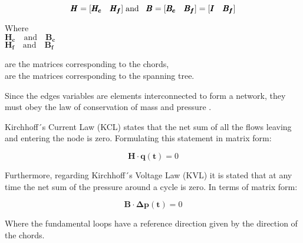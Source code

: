 \begin{equation}
\pmb{H} = [\pmb{H_c} \quad \pmb{H_f}]
\hspace{0.1cm} \text{and}\hspace{0.3cm}
\pmb{B} = [\pmb{B_c}  \quad \pmb{B_f}] = [\pmb{I} \quad \pmb{B_f}]
\label{HandB}
\end{equation}

\begin{minipage}[t]{0.20\textwidth}
Where\\
\hspace*{8mm} $\pmb{H_c} \quad \text{and} \quad \pmb{B_c}$ \\
\hspace*{8mm} $\pmb{H_f} \quad \text{and} \quad \pmb{B_f}$ 
\end{minipage}
\begin{minipage}[t]{0.68\textwidth}
\vspace*{2mm}
\hspace*{8mm} are the matrices corresponding to the chords,\\
\hspace*{8mm} are the matrices corresponding to the spanning tree. 
\end{minipage}

Since the edges variables are elements interconnected to form a network, 
they must obey the law of conservation of mass and pressure \cite{GraphModel}. 

Kirchhoff´s Current Law (KCL) states that the net sum of all the flows leaving and entering the node is zero. Formulating this statement in matrix form:

\begin{equation}
  \label{KCL}
  \pmb{H} \cdot \pmb{q(t)} = 0
\end{equation}

Furthermore, regarding Kirchhoff´s Voltage Law (KVL) it is stated that at any time the net sum of the pressure around a cycle 
is zero. In terms of matrix form:

\begin{equation}
 \label{KVL} 
 \pmb{B} \cdot \pmb{\Delta p (t)} = 0
\end{equation}

Where the fundamental loops have a reference direction given by the direction of the 
chords. 





 